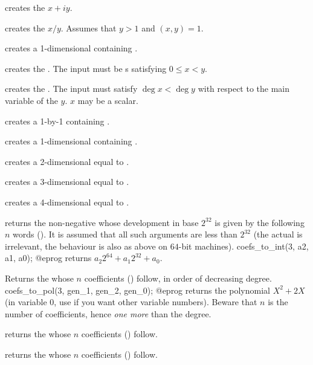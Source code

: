  creates the  $x + iy$.

 creates the  $x/y$. Assumes that
$y > 1$ and $(x,y) = 1$.

 creates a 1-dimensional  containing .

 creates the  .
The input must be s satisfying $0 \leq x < y$.

 creates the  .
The input must satisfy $\deg x < \deg y$ with respect to the main variable of
the  $y$. $x$ may be a scalar.

 creates a 1-by-1  containing .

 creates a 1-dimensional  containing .

 creates a 2-dimensional  equal to
\kbd{[x,y]}.

 creates a 3-dimensional 
equal to \kbd{[x,y,z]}.

 creates a 4-dimensional 
equal to \kbd{[x,y,z,t]}.

\smallskip

 returns the non-negative  whose
development in base $2^{32}$ is given by the following $n$ words
(). It is assumed that all such arguments are less than
$2^{32}$ (the actual  is irrelevant, the behaviour is also
as above on $64$-bit machines).
\bprog
  coefs_to_int(3, a2, a1, a0);
@eprog
\noindent returns $a_2 2^{64} + a_1 2^{32} + a_0$.

 Returns the  whose $n$
coefficients () follow, in order of decreasing degree.
\bprog
  coefs_to_pol(3, gen_1, gen_2, gen_0);
@eprog
\noindent returns the polynomial $X^2 + 2X$ (in variable $0$, use
 if you want other variable numbers). Beware that $n$ is the
number of coefficients, hence \emph{one more} than the degree.

 returns the  whose $n$
coefficients () follow.

 returns the  whose $n$
coefficients () follow.

